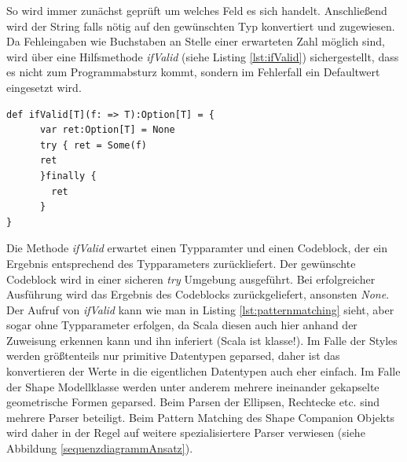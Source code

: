 So wird immer zunächst geprüft um welches Feld es sich handelt. Anschließend wird der String falls nötig auf den gewünschten Typ konvertiert und zugewiesen. Da Fehleingaben wie Buchstaben an Stelle einer erwarteten Zahl möglich sind, wird über eine Hilfsmethode \textit{ifValid} (siehe Listing \ref{lst:ifValid}) sichergestellt, dass es nicht zum Programmabsturz kommt, sondern im Fehlerfall ein Defaultwert eingesetzt wird.
\begin{lstlisting}[style=scala, caption = {Methode ifValid}, label = {lst:ifValid}]
def ifValid[T](f: => T):Option[T] = {
      var ret:Option[T] = None
      try { ret = Some(f)
      ret
      }finally {
        ret
      }
}
\end{lstlisting}Die Methode \textit{ifValid} erwartet einen Typparamter und einen Codeblock, der ein Ergebnis entsprechend des Typparameters zurückliefert. Der gewünschte Codeblock wird in einer sicheren \textit{try} Umgebung ausgeführt. Bei erfolgreicher Ausführung wird das Ergebnis des Codeblocks zurückgeliefert, ansonsten \textit{None}.
Der Aufruf von \textit{ifValid} kann wie man in Listing \ref{lst:patternmatching} sieht, aber sogar ohne Typparameter erfolgen, da Scala diesen auch hier anhand der Zuweisung erkennen kann und ihn inferiert (Scala ist klasse!).
Im Falle der Styles werden größtenteils nur primitive Datentypen geparsed, daher ist das konvertieren der Werte in die eigentlichen Datentypen auch eher einfach.
Im Falle der Shape Modellklasse werden unter anderem mehrere ineinander gekapselte geometrische Formen geparsed. Beim Parsen der Ellipsen, Rechtecke etc. sind mehrere Parser beteiligt. Beim Pattern Matching des Shape Companion Objekts wird daher in der Regel auf weitere spezialisiertere Parser verwiesen (siehe Abbildung \ref{sequenzdiagrammAnsatz}).



